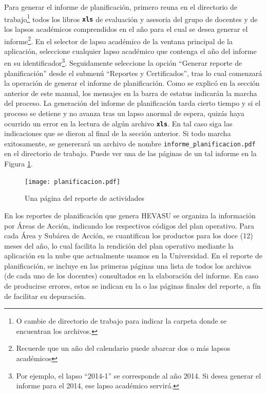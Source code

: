 \documentclass[letterpaper,12pt]{book}
\newcommand{\archivo}[1]
{\texttt{#1}}
\newcommand{\fileformat}[1]{\textbf{\texttt{#1}}}
\begin{document}
Para generar el informe de planificación, primero reuna en el directorio de trabajo\footnote{O cambie de directorio de trabajo para indicar la carpeta donde se encuentran los archivos.} todos los libros \fileformat{xls} de evaluación y asesoria del grupo de docentes y de los lapsos académicos comprendidos en el año para el cual se desea generar el informe\footnote{Recuerde que un año del calendario puede abarcar dos o más lapsos académicos}. En el selector de lapso académico de la ventana principal de la aplicación, seleccione cualquier lapso académico que contenga el año del informe en su identificador\footnote{Por ejemplo, el lapso ``2014-1'' se corresponde al año 2014. Si desea generar el informe para el 2014, ese lapso académico servirá.}. Seguidamente seleccione la opción ``Generar reporte de planificación'' desde el submenú ``Reportes y Certificados'', tras lo cual comenzará la operación de generar el informe de planificación. Como se explicó en la sección anterior de este manual, los mensajes en la barra de estatus indicarán la marcha del proceso. La generación del informe de planificación tarda cierto tiempo y si el proceso se detiene y no avanza tras un lapso anormal de espera, quizás haya ocurrido un error en la lectura de algún archivo \fileformat{xls}. En tal caso siga las indicaciones que se dieron al final de la sección anterior. Si todo marcha exitosamente, se genererará un archivo de nombre \archivo{informe\_planificacion.pdf} en el directorio de trabajo. Puede ver una de las páginas de un tal informe en la Figura \ref{fig:reporte_planificacion_pdf}.

\begin{figure}[!ht]
	\centering
	\texttt{[image: planificacion.pdf]}
	\caption{Una página del reporte de actividades}
	\label{fig:reporte_planificacion_pdf}
\end{figure}

En los reportes de planificación que genera HEVASU se organiza la información por Áreas de Acción, indicando los respectivos códigos del plan operativo. Para cada Área y Subárea de Acción, se cuantifican los productos para los doce (12) meses del año, lo cual facilita la rendición del plan operativo mediante la aplicación en la nube que actualmente usamos en la Universidad. En el reporte de planificación, se incluye en las primeras páginas una lista de todos los archivos (de cada uno de los docentes) consultados en la elaboración del informe. En caso de producirse errores, estos se indican en la o las páginas finales del reporte, a fín de facilitar su depuración.
\end{document}
